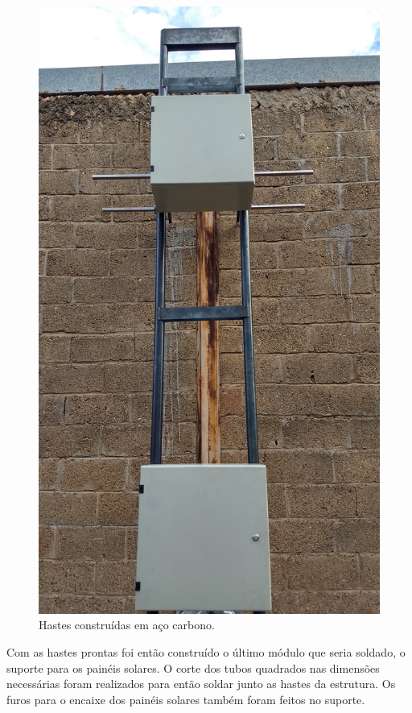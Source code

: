 \begin{figure}[H]
	\centering
    \includegraphics[keepaspectratio=true,scale=0.12]{figuras/estrucomp1.jpg}
    \caption{Hastes construídas em aço carbono.}
    \label{hastescons}
\end{figure}

Com as hastes prontas foi então construído o último módulo que seria soldado, o suporte para os painéis solares. O corte dos tubos quadrados nas dimensões necessárias foram realizados para então soldar junto as hastes da estrutura. Os furos para o encaixe dos painéis solares também foram feitos no suporte.

